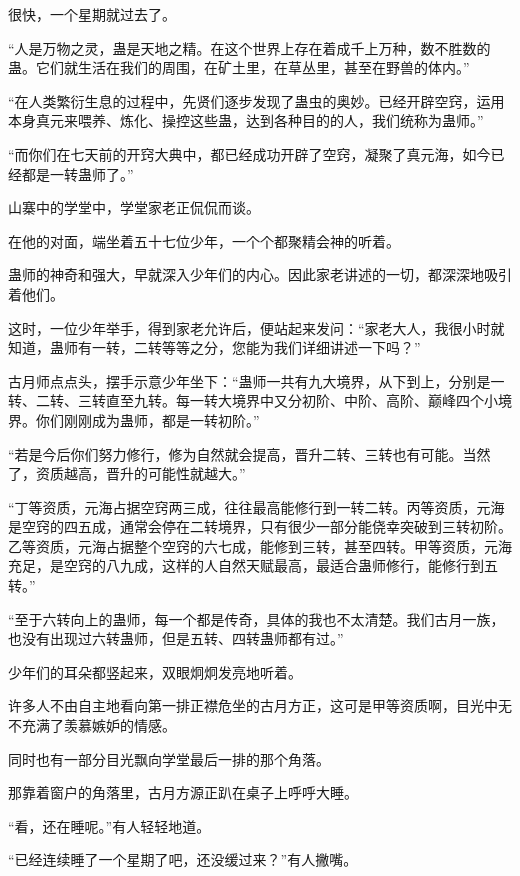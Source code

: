 
\begin{this_body}

很快，一个星期就过去了。

“人是万物之灵，蛊是天地之精。在这个世界上存在着成千上万种，数不胜数的蛊。它们就生活在我们的周围，在矿土里，在草丛里，甚至在野兽的体内。”

“在人类繁衍生息的过程中，先贤们逐步发现了蛊虫的奥妙。已经开辟空窍，运用本身真元来喂养、炼化、操控这些蛊，达到各种目的的人，我们统称为蛊师。”

“而你们在七天前的开窍大典中，都已经成功开辟了空窍，凝聚了真元海，如今已经都是一转蛊师了。”

山寨中的学堂中，学堂家老正侃侃而谈。

在他的对面，端坐着五十七位少年，一个个都聚精会神的听着。

蛊师的神奇和强大，早就深入少年们的内心。因此家老讲述的一切，都深深地吸引着他们。

这时，一位少年举手，得到家老允许后，便站起来发问：“家老大人，我很小时就知道，蛊师有一转，二转等等之分，您能为我们详细讲述一下吗？”

古月师点点头，摆手示意少年坐下：“蛊师一共有九大境界，从下到上，分别是一转、二转、三转直至九转。每一转大境界中又分初阶、中阶、高阶、巅峰四个小境界。你们刚刚成为蛊师，都是一转初阶。”

“若是今后你们努力修行，修为自然就会提高，晋升二转、三转也有可能。当然了，资质越高，晋升的可能性就越大。”

“丁等资质，元海占据空窍两三成，往往最高能修行到一转二转。丙等资质，元海是空窍的四五成，通常会停在二转境界，只有很少一部分能侥幸突破到三转初阶。乙等资质，元海占据整个空窍的六七成，能修到三转，甚至四转。甲等资质，元海充足，是空窍的八九成，这样的人自然天赋最高，最适合蛊师修行，能修行到五转。”

“至于六转向上的蛊师，每一个都是传奇，具体的我也不太清楚。我们古月一族，也没有出现过六转蛊师，但是五转、四转蛊师都有过。”

少年们的耳朵都竖起来，双眼炯炯发亮地听着。

许多人不由自主地看向第一排正襟危坐的古月方正，这可是甲等资质啊，目光中无不充满了羡慕嫉妒的情感。

同时也有一部分目光飘向学堂最后一排的那个角落。

那靠着窗户的角落里，古月方源正趴在桌子上呼呼大睡。

“看，还在睡呢。”有人轻轻地道。

“已经连续睡了一个星期了吧，还没缓过来？”有人撇嘴。


\end{this_body}
